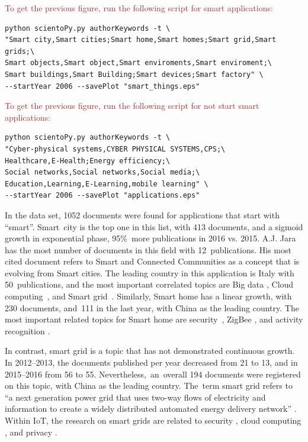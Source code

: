 \documentclass[symmetry,article,accept,moreauthors,pdftex10pt,a4paper]{mdpi}
\begin{document}
\noindent
\textcolor{brown}{To get the previous figure, run the following script for smart applications:}\\
\begin{verbatim}
python scientoPy.py authorKeywords -t \
"Smart city,Smart cities;Smart home,Smart homes;Smart grid,Smart grids;\
Smart objects,Smart object,Smart enviroments,Smart enviroment;\
Smart buildings,Smart Building;Smart devices;Smart factory" \
--startYear 2006 --savePlot "smart_things.eps"
\end{verbatim}

\noindent
\textcolor{brown}{To get the previous figure, run the following script for not start smart applications:}\\
\begin{verbatim}
python scientoPy.py authorKeywords -t \
"Cyber-physical systems,CYBER PHYSICAL SYSTEMS,CPS;\
Healthcare,E-Health;Energy efficiency;\
Social networks,Social networks,Social media;\
Education,Learning,E-Learning,mobile learning" \
--startYear 2006 --savePlot "applications.eps"
\end{verbatim}

In the data set, 1052 documents were found for applications that start with ``smart''. Smart~city is the top one in this list, with 413 documents, and a sigmoid growth in exponential phase, 95\%~more publications in 2016 vs. 2015. A.J. Jara has the most number of documents in this field with 12~publications. His most cited document \cite{7406686} refers to Smart and Connected Communities as a concept that is evolving from Smart cities. The leading country in this application is Italy with 50~publications, and the most important correlated topics are Big data \cite{Li2014631,Moreno-Cano2015418,GomezRomero2016}, Cloud computing~\cite{Kaur2016,Chang201642}, and Smart grid~\cite{Longo2014458,Longo2015281}. Similarly, Smart home has a linear growth, with 230 documents, and~111 in the last year, with China as the leading country. The most important related topics for Smart home are security~\cite{UlRehman2016,Alohali2014115,Peter2017}, ZigBee \cite{Peng2016335,Yiqi2014114,Gong201689}, and activity recognition \cite{Cicirelli2016,Bourobou201511953,Fortino2015}.

In contrast, smart grid is a topic that has not demonstrated continuous growth. In 2012--2013, the documents published per year decreased from 21 to 13, and in 2015--2016 from 56 to 55. Nevertheless,~an~overall 194 documents were registered on this topic, with China as the leading country. The~term smart grid refers to ``a next generation power grid that uses two-way flows of electricity and information to create a widely distributed automated energy delivery network'' \cite{Fang2012944}. Within IoT, the research on smart grids are related to  security \cite{Noll2014371,Pitas2014231,Dalipi201663}, cloud computing \cite{Meloni2016387,Wang20111}, and privacy \cite{Beligianni2016,Winter201545,Dalipi201663}.
\end{document}
